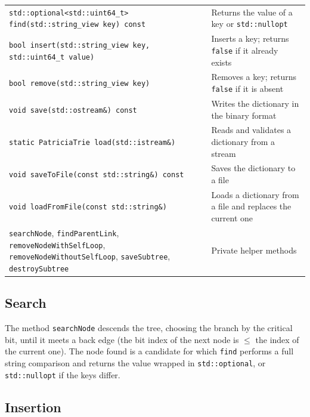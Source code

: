 \begin{table}[!ht]
\centering
\begin{tabular}{|P{7.5cm}|P{7.5cm}|}
\hline
{}
 \\
\hline
\texttt{std::optional<std::uint64\_t> find(std::string\_view key) const} & Returns the value of a key or \texttt{std::nullopt} \\
\hline
\texttt{bool insert(std::string\_view key, std::uint64\_t value)} & Inserts a key; returns \texttt{false} if it already exists \\
\hline
\texttt{bool remove(std::string\_view key)} & Removes a key; returns \texttt{false} if it is absent \\
\hline
\texttt{void save(std::ostream\&) const} & Writes the dictionary in the binary format \\
\hline
\texttt{static PatriciaTrie load(std::istream\&)} & Reads and validates a dictionary from a stream \\
\hline
\texttt{void saveToFile(const std::string\&) const} & Saves the dictionary to a file \\
\hline
\texttt{void loadFromFile(const std::string\&)} & Loads a dictionary from a file and replaces the current one \\
\hline
\texttt{searchNode}, \texttt{findParentLink}, \texttt{removeNodeWithSelfLoop}, \texttt{removeNodeWithoutSelfLoop}, \texttt{saveSubtree}, \texttt{destroySubtree} & Private helper methods \\
\hline
\end{tabular}
\end{table}

\subsection{Search}

The method \texttt{searchNode} descends the tree, choosing the branch by the critical bit, until it
meets a back edge (the bit index of the next node is $\leq$ the index of the current one). The node
found is a candidate for which \texttt{find} performs a full string comparison and returns the
value wrapped in \texttt{std::optional}, or \texttt{std::nullopt} if the keys differ.

\subsection{Insertion}

